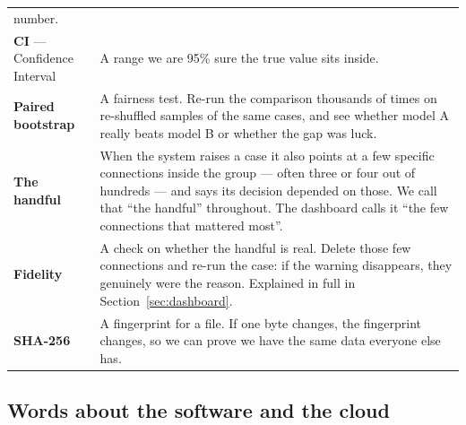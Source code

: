 \documentclass[11pt,a4paper]{article}
\begin{document}
\begin{longtable}{@{}p{4.1cm}p{11.4cm}@{}}
number. \\
\textbf{CI} --- Confidence Interval & A range we are 95\% sure the true value sits
inside. \\
\textbf{Paired bootstrap} & A fairness test. Re-run the comparison thousands of
times on re-shuffled samples of the same cases, and see whether model A really
beats model B or whether the gap was luck. \\
\textbf{The handful} & When the system raises a case it also points at a few
specific connections inside the group --- often three or four out of hundreds
--- and says its decision depended on those. We call that ``the handful''
throughout. The dashboard calls it ``the few connections that mattered most''.
\\
\textbf{Fidelity} & A check on whether the handful is real. Delete those few
connections and re-run the case: if the warning disappears, they genuinely were
the reason. Explained in full in Section~\ref{sec:dashboard}. \\
\textbf{SHA-256} & A fingerprint for a file. If one byte changes, the fingerprint
changes, so we can prove we have the same data everyone else has. \\
\bottomrule
\end{longtable}

\subsection{Words about the software and the cloud}
\end{document}
